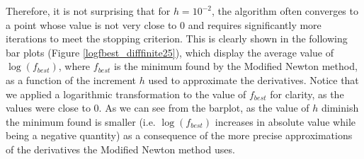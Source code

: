 Therefore, it is not surprising that for $h = 10^{-2}$, the algorithm often converges to a point whose value is not very close to $0$ and requires significantly more iterations to meet the stopping criterion.
This is clearly shown in the following bar plots (Figure \ref{logfbest_difffinite25}), which display the average value of $\log (f_{best})$, where $f_{best}$ is the minimum found by the Modified Newton method, as a function of the increment $h$ used to approximate the derivatives. Notice that we applied a logarithmic transformation to the value of $f_{best}$ for clarity, as the values were close to $0$.
As we can see from the barplot, as the value of $h$ diminish the minimum found is smaller (i.e. $\log(f_{best})$ increases in absolute value while being a negative quantity) as a consequence of the more precise approximations of the derivatives the Modified Newton method uses.


